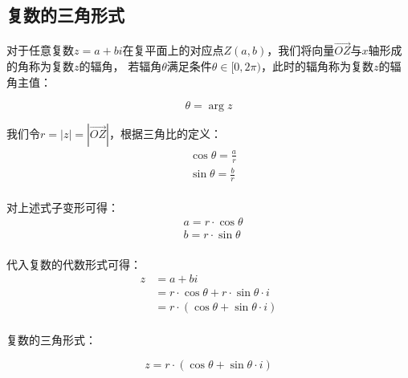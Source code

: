 \documentclass[UTF8]{ctexart}
\begin{document}
\subsection{复数的三角形式}
    对于任意复数$z=a+bi$在复平面上的对应点$Z(a,b)$，我们将向量$\overrightarrow{OZ}$与$x$轴形成的角称为复数$z$的辐角，
    若辐角$\theta$满足条件$\theta\in[0,2\pi)$，此时的辐角称为复数$z$的辐角主值：
    \begin{large}
        \begin{equation*}
            \theta=\arg z
        \end{equation*}
    \end{large}
    我们令$r=|z|=|\overrightarrow{OZ}|$，根据三角比的定义：
    \setcounter{equation}{0}
    \begin{align}
        &\cos{\theta}=\frac{a}{r}\\[3mm]
        &\sin{\theta}=\frac{b}{r}
    \end{align}\\
    对上述式子变形可得：
    \begin{align}
        &a=r\cdot\cos{\theta}\\[3mm]
        &b=r\cdot\sin{\theta}
    \end{align}\\
    代入复数的代数形式可得：
    \begin{align}
        z
        &=a+bi\\[3mm]
        &=r\cdot\cos{\theta}+r\cdot\sin{\theta}\cdot i\\[3mm]
        &=r\cdot(\cos{\theta}+\sin{\theta}\cdot i)
    \end{align}\\
    复数的三角形式：
    \begin{large}
        \begin{equation*}
            z=r\cdot(\cos{\theta}+\sin{\theta}\cdot i)
        \end{equation*}
    \end{large}

\newpage
\end{document}
